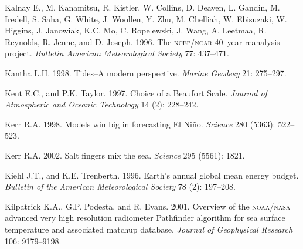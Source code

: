 \begin{thebibliography}{999}
Kalnay E., M. Kanamitsu, R. Kistler, W. Collins, D. Deaven, L. Gandin,
M. Iredell, S. Saha, G. White, J. Woollen, Y. Zhu, M. Chelliah,
W. Ebisuzaki, W.  Higgins, J. Janowiak, K.C. Mo, C. Ropelewski,
J. Wang, A. Leetmaa, R. Reynolds, R. Jenne, and D. Joseph. 1996. The
\textsc{ncep/ncar} 40--year reanalysis project. \textit{Bulletin
  American Meteorological Society} 77: 437--471.
%

Kantha L.H.  1998. Tides--A modern perspective. \textit{Marine
  Geodesy} 21: 275--297.
%

Kent E.C., and P.K. Taylor.  1997. Choice of a Beaufort Scale.
\textit{Journal of Atmospheric and Oceanic Technology} 14 (2):
228--242.
%

Kerr R.A.  1998. Models win big in forecasting El
Ni\~{n}o. \textit{Science} 280 (5363): 522--523.
%

Kerr R.A.  2002. Salt fingers mix the sea. \textit{Science} 295
(5561): 1821.
%

Kiehl J.T., and K.E. Trenberth.  1996. Earth's annual global mean
energy budget. \textit{Bulletin of the American Meteorological
  Society} 78 (2): 197--208.
%

Kilpatrick K.A., G.P. Podesta, and R. Evans.  2001. Overview of the
\textsc{noaa/nasa} advanced very high resolution radiometer Pathfinder
algorithm for sea surface temperature and associated matchup
database. \textit{Journal of Geophysical Research} 106: 9179--9198.
%


\end{thebibliography}
